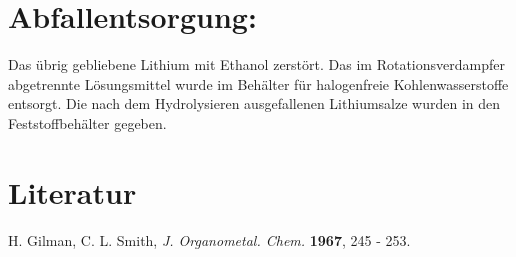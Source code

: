 \documentclass[12pt]{article}
\begin{document}
\begin{onehalfspace}
\section{Abfallentsorgung:}
Das übrig gebliebene Lithium mit Ethanol zerstört. 
Das im Rotationsverdampfer abgetrennte Lösungsmittel wurde im Behälter für halogenfreie Kohlenwasserstoffe entsorgt.
Die nach dem Hydrolysieren ausgefallenen Lithiumsalze wurden in den Feststoffbehälter gegeben.

\section{Literatur}
\renewcommand{\section}[2]{}%
\begin{thebibliography}{}
H. Gilman, C. L. Smith, \textit{J. Organometal. Chem.} \textbf{1967}, 245 - 253.
\end{thebibliography}
\end{onehalfspace}
\end{document}
